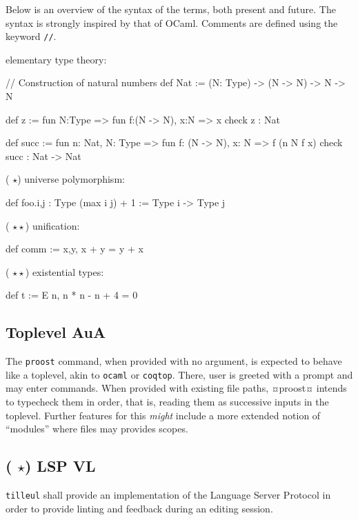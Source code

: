 \documentclass[twocolumn]{article}
\newcommand{\members}[1]{\texorpdfstring{\hfill\scriptsize #1}{}}
\newcommand{\etun}{({\color{Green} $\star$}) }
\newcommand{\etde}{({\color{Orange} $\star\star$}) }
\begin{document}
Below is an overview of the syntax of the terms, both present and future. The syntax is strongly inspired by that of OCaml. Comments are defined using the keyword \texttt{//}.

\vspace{1.2mm}
elementary type theory:
\begin{proost}
// Construction of natural numbers
def Nat :=
  (N: Type) -> (N -> N) -> N -> N

def z := fun N:Type =>
  fun f:(N -> N), x:N => x
check z : Nat

def succ := fun n: Nat, N: Type =>
  fun f: (N -> N), x: N => f (n N f x)
check succ : Nat -> Nat
\end{proost}

\etun universe polymorphism:
\begin{proost}
def foo.{i,j} : Type (max i j) + 1
:= Type i -> Type j
\end{proost}

\etde unification:
\begin{proost}
def comm := \/ x,y, x + y = y + x
\end{proost}

\etde existential types:
\begin{proost}
def t := E n, n * n - n + 4 = 0
\end{proost}


\subsection{Toplevel  \members{AuA}}
The \texttt{proost} command, when provided with no argument, is expected to behave like a toplevel, akin to \texttt{ocaml} or \texttt{coqtop}. There, user is greeted with a prompt and may enter commands. When provided with existing file paths, ¤proost¤ intends to typecheck them in
order, that is, reading them as successive inputs in the toplevel. Further features for this \emph{might} include a more extended notion of ``modules'' where files may provides scopes.
{
  \begin{center}
  \end{center}
}


\subsection{\etun LSP \members{VL}}
\texttt{tilleul} shall provide an implementation of the Language Server Protocol in order to provide linting and feedback during an editing session.
\end{document}

